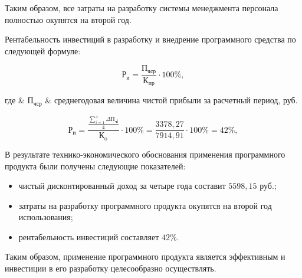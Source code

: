 Таким образом, все затраты на разработку системы менеджмента персонала полностью окупятся на второй год.

Рентабельность инвестиций в разработку и внедрение программного средства по следующей формуле:

\begin{equation}
  \text{Р}_\text{и} = \frac{\text{П}_\text{чср}}{\text{К}_\text{пр}} \cdot 100\%,
\end{equation}
\begin{explanation}
  где & $ \text{П}_\text{чср} $ & среднегодовая величина чистой прибыли за расчетный период, руб.
\end{explanation}

\begin{equation}
  \text{Р}_\text{и} = \frac{\frac{\sum_{i=1}^{4} \Delta\text{П}_\text{чi}}{4}}{\text{К}_\text{o}} \cdot 100\% = \frac{3378,27}{7914,91} \cdot 100\% = 42\%,
\end{equation}

В результате технико-экономического обоснования применения программного продукта были получены следующие показателей:
\begin{itemize}
	\item чистый дисконтированный доход за четыре года составит $5598,15$ руб.;
	\item затраты на разработку программного продукта окупятся на второй год использования;
	\item рентабельность инвестиций составляет $42\%$.
\end{itemize}

Таким образом, применение программного продукта является эффективным и инвестиции в его разработку целесообразно
осуществлять.
